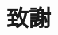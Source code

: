 \chapter{致謝}
\renewcommand{\baselinestretch}{10} %
\par
\renewcommand{\baselinestretch}{1} %
\fontsize{12pt}\baselineskip\selectfont\qquad
\par